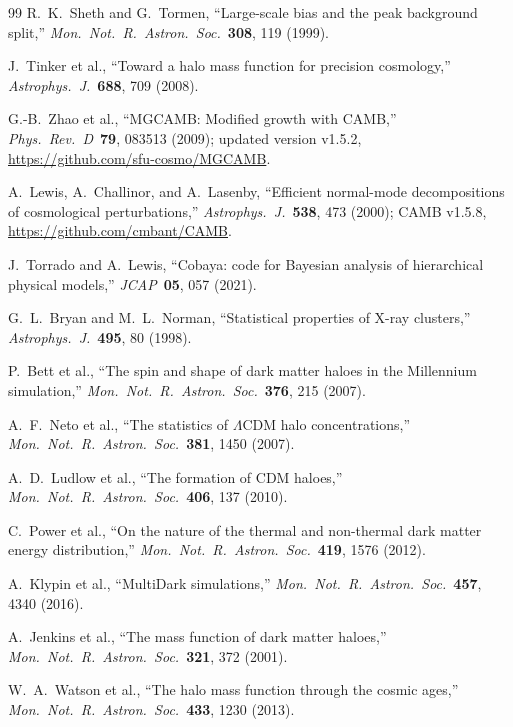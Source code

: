 \documentclass[twocolumn,a4paper,aps,prd,twocolumn,showpacs,notitlepage,superscriptaddress,nofootinbib]{article}
\begin{document}
\begin{thebibliography}{99}
R.~K.~Sheth and G.~Tormen,
``Large-scale bias and the peak background split,''
\textit{Mon.\ Not.\ R.\ Astron.\ Soc.}\ \textbf{308}, 119 (1999).

J.~Tinker et al.,
``Toward a halo mass function for precision cosmology,''
\textit{Astrophys.\ J.}\ \textbf{688}, 709 (2008).

G.-B.~Zhao et al.,
``MGCAMB: Modified growth with CAMB,''
\textit{Phys.\ Rev.\ D}\ \textbf{79}, 083513 (2009);
updated version v1.5.2, \url{https://github.com/sfu-cosmo/MGCAMB}.

A.~Lewis, A.~Challinor, and A.~Lasenby,
``Efficient normal-mode decompositions of cosmological perturbations,''
\textit{Astrophys.\ J.}\ \textbf{538}, 473 (2000);
CAMB v1.5.8, \url{https://github.com/cmbant/CAMB}.

J.~Torrado and A.~Lewis,
``Cobaya: code for Bayesian analysis of hierarchical physical models,''
\textit{JCAP}\ \textbf{05}, 057 (2021).

G.~L.~Bryan and M.~L.~Norman,
``Statistical properties of X-ray clusters,''
\textit{Astrophys.\ J.}\ \textbf{495}, 80 (1998).

P.~Bett et al.,
``The spin and shape of dark matter haloes in the Millennium simulation,''
\textit{Mon.\ Not.\ R.\ Astron.\ Soc.}\ \textbf{376}, 215 (2007).

A.~F.~Neto et al.,
``The statistics of $\Lambda$CDM halo concentrations,''
\textit{Mon.\ Not.\ R.\ Astron.\ Soc.}\ \textbf{381}, 1450 (2007).

A.~D.~Ludlow et al.,
``The formation of CDM haloes,''
\textit{Mon.\ Not.\ R.\ Astron.\ Soc.}\ \textbf{406}, 137 (2010).

C.~Power et al.,
``On the nature of the thermal and non-thermal dark matter energy distribution,''
\textit{Mon.\ Not.\ R.\ Astron.\ Soc.}\ \textbf{419}, 1576 (2012).

A.~Klypin et al.,
``MultiDark simulations,''
\textit{Mon.\ Not.\ R.\ Astron.\ Soc.}\ \textbf{457}, 4340 (2016).

A.~Jenkins et al.,
``The mass function of dark matter haloes,''
\textit{Mon.\ Not.\ R.\ Astron.\ Soc.}\ \textbf{321}, 372 (2001).

W.~A.~Watson et al.,
``The halo mass function through the cosmic ages,''
\textit{Mon.\ Not.\ R.\ Astron.\ Soc.}\ \textbf{433}, 1230 (2013).


\end{thebibliography}
\end{document}
